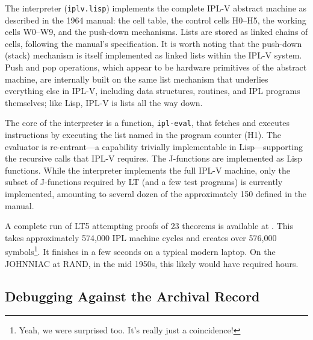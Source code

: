 \documentclass[journal]{IEEEtran}
\begin{document}
The interpreter (\texttt{iplv.lisp}) implements the complete IPL-V
abstract machine as described in the 1964 manual: the cell table, the
control cells H0--H5, the working cells W0--W9, and the push-down
mechanisms. Lists are stored as linked chains of cells, following the
manual's specification. It is worth noting that the push-down (stack)
mechanism is itself implemented as linked lists within the IPL-V
system. Push and pop operations, which appear to be hardware
primitives of the abstract machine, are internally built on the same
list mechanism that underlies everything else in IPL-V, including data
structures, routines, and IPL programs themselves; like Lisp, IPL-V is
lists all the way down.

The core of the interpreter is a function, \texttt{ipl-eval}, that
fetches and executes instructions by executing the list named in the
program counter (H1). The evaluator is re-entrant---a capability
trivially implementable in Lisp---supporting the recursive calls that
IPL-V requires. The J-functions are implemented as Lisp functions.
While the interpreter implements the full IPL-V machine, only the
subset of J-functions required by LT (and a few test programs) is
currently implemented, amounting to several dozen of the approximately
150 defined in the manual.

A complete run of LT5 attempting proofs of 23 theorems is available at
\cite{runoutput}. This takes approximately 574,000 IPL machine cycles
and creates over 576,000 symbols\footnote{Yeah, we were surprised too.
It's really just a coincidence!}. It finishes in a few seconds on a
typical modern laptop. On the JOHNNIAC at RAND, in the mid 1950s, this
likely would have required hours.

\subsection{Debugging Against the Archival Record}
\label{sec:debugging}

\end{document}

